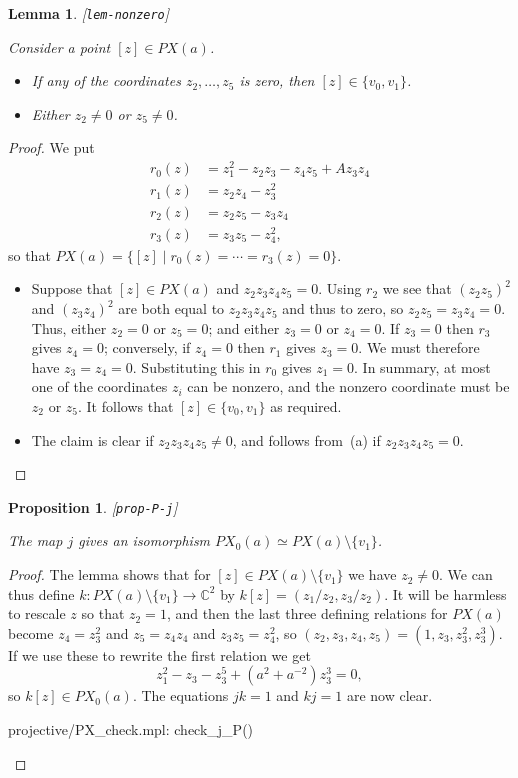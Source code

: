 \documentclass[reqno]{amsart}
\newcommand{\lbl}[1]{\label{#1}\textup{[\texttt{#1}]}\par}
\newcommand{\lbl}{\label}
\newcommand{\C}         {{\mathbb{C}}}
\newcommand{\st}        {\;|\;}
\newcommand{\sm}        {\setminus}
\renewcommand{\:}{\colon}
\newtheorem{lemma}[theorem]{Lemma}
\newtheorem{proposition}[theorem]{Proposition}
\theoremstyle{definition}
\begin{document}
\begin{lemma}\lbl{lem-nonzero}
 Consider a point $[z]\in PX(a)$.
 \begin{itemize}
  \item[(a)] If any of the coordinates $z_2,\dotsc,z_5$ is zero, then
   $[z]\in\{v_0,v_1\}$.
  \item[(b)] Either $z_2\neq 0$ or $z_5\neq 0$.
 \end{itemize}
\end{lemma}
\begin{proof}
 We put
 \begin{align*}
  r_0(z) &= z_1^2-z_2z_3-z_4z_5+Az_3z_4 \\
  r_1(z) &= z_2 z_4 - z_3^2 \\
  r_2(z) &= z_2 z_5 - z_3 z_4 \\
  r_3(z) &= z_3 z_5 - z_4^2,
 \end{align*}
 so that $PX(a)=\{[z]\st r_0(z)=\dotsb=r_3(z)=0\}$.
 \begin{itemize}
  \item[(a)] Suppose that $[z]\in PX(a)$ and $z_2z_3z_4z_5=0$.  Using
   $r_2$ we see that $(z_2z_5)^2$ and $(z_3z_4)^2$ are both equal to
   $z_2z_3z_4z_5$ and thus to zero, so $z_2z_5=z_3z_4=0$.  Thus, either
   $z_2=0$ or $z_5=0$; and either $z_3=0$ or $z_4=0$.  If $z_3=0$ then
   $r_3$ gives $z_4=0$; conversely, if $z_4=0$ then $r_1$ gives
   $z_3=0$.  We must therefore have $z_3=z_4=0$.  Substituting this in
   $r_0$ gives $z_1=0$.  In summary, at most one of the coordinates
   $z_i$ can be nonzero, and the nonzero coordinate must be $z_2$ or
   $z_5$.  It follows that $[z]\in\{v_0,v_1\}$ as required.
  \item[(b)] The claim is clear if $z_2z_3z_4z_5\neq 0$, and follows
   from~(a) if $z_2z_3z_4z_5=0$.
 \end{itemize}
\end{proof}

\begin{proposition}\lbl{prop-P-j}
 The map $j$ gives an isomorphism $PX_0(a)\simeq PX(a)\sm\{v_1\}$.
\end{proposition}
\begin{proof}
 The lemma shows that for $[z]\in PX(a)\sm\{v_1\}$ we have
 $z_2\neq 0$.  We can thus define $k\:PX(a)\sm\{v_1\}\to\C^2$ by
 $k[z]=(z_1/z_2,z_3/z_2)$.  It will be harmless to rescale $z$ so
 that $z_2=1$, and then the last three defining relations for $PX(a)$
 become $z_4=z_3^2$ and $z_5=z_4z_4$ and $z_3z_5=z_4^2$, so
 $(z_2,z_3,z_4,z_5)=(1,z_3,z_3^2,z_3^3)$.  If we use these to rewrite
 the first relation we get
 \[ z_1^2-z_3-z_3^5+(a^2+a^{-2})z_3^3 = 0, \]
 so $k[z]\in PX_0(a)$.  The equations $jk=1$ and $kj=1$ are now
 clear.
 \begin{checks}
  projective/PX_check.mpl: check_j_P()
 \end{checks}
\end{proof}
\end{document}
